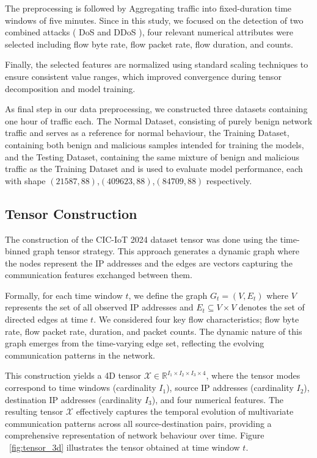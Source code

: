 \documentclass[preprint,12pt,authoryear]{elsarticle}
\begin{document}
The preprocessing is followed by Aggregating traffic into fixed-duration time windows of five minutes. Since in this study, we focused on the detection of two combined attacks ( DoS and DDoS ), four relevant numerical attributes were selected including flow byte rate, flow packet rate, flow duration, and counts. 

Finally, the selected features are normalized using standard scaling techniques to ensure consistent value ranges, which improved convergence during tensor decomposition and model training.

As  final step in our data preprocessing, we constructed three datasets containing one hour of traffic each. The Normal Dataset, consisting of purely benign network traffic and serves as a reference for normal behaviour, the Training Dataset, containing both benign and malicious samples intended for training the models, and the Testing Dataset, containing the same mixture of benign and malicious traffic as the Training Dataset and is used to evaluate model performance, each with shape  $(21587, 88)$,$(409623, 88)$,$
(84709, 88)$ respectively. 





\subsection{Tensor Construction}
The construction of the CIC-IoT 2024 dataset tensor was done using the time-binned graph tensor strategy. This approach generates a dynamic graph where the nodes represent the IP addresses and the edges are vectors capturing the communication features exchanged between them. 

Formally, for each time window $t$, we define the graph $G_t = (V, E_t)$ where $V$ represents the set of all observed IP addresses and $E_t \subseteq V \times V$ denotes the set of directed edges at time $t$. We considered four key flow characteristics; flow byte rate, flow packet rate, duration, and packet counts. The dynamic nature of this graph emerges from the time-varying edge set, reflecting the evolving communication patterns in the network. 

This construction yields a 4D tensor $\mathcal{X} \in \mathbb{R}^{I_1 \times I_2 \times I_3 \times 4}$, where the tensor modes correspond to time windows (cardinality $I_1$), source IP addresses (cardinality $I_2$), destination IP addresses (cardinality $I_3$), and four numerical features. The resulting tensor $\mathcal{X}$ effectively captures the temporal evolution of multivariate communication patterns across all source-destination pairs, providing a comprehensive representation of network behaviour  over time. Figure ~\ref{fig:tensor_3d} illustrates the tensor obtained at time window $t$.
\end{document}
